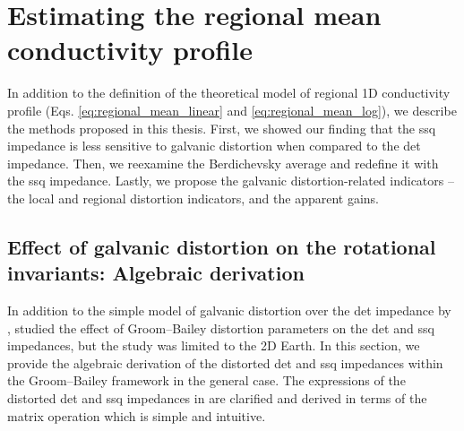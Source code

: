 
\renewcommand{\thisdir}{_content/reg1d_method}
\renewcommand{\figdir}{\thisdir/_fig}
\chapter[Proposed Methods]{Estimating the regional mean conductivity profile} 
\label{chap:method}

In addition to the definition of the theoretical model of regional 1D conductivity profile (Eqs. \ref{eq:regional_mean_linear} and \ref{eq:regional_mean_log}), we describe the methods proposed in this thesis. First, we showed our finding that the ssq impedance is less sensitive to galvanic distortion when compared to the det impedance. Then, we reexamine the Berdichevsky average and redefine it with the ssq impedance. Lastly, we propose the galvanic distortion-related indicators -- the local and regional distortion indicators, and the apparent gains.


\section[Distorted invariant impedances]{Effect of galvanic distortion on the rotational invariants: Algebraic derivation}\label{sect:distorted_invariants}
	In addition to the simple model of galvanic distortion over the det impedance by \citet{berdichevsky1980a}, \citet{gomez-trevino2013a} studied the effect of Groom--Bailey distortion parameters on the det and ssq impedances, but the study was limited to the 2D Earth.
	In this section, we provide the algebraic derivation of the distorted det and ssq impedances within the Groom--Bailey framework in the general case. 
	The expressions of the distorted det and ssq impedances in \citet{rung-arunwan2016a} are clarified and derived in terms of the matrix operation which is simple and intuitive.

